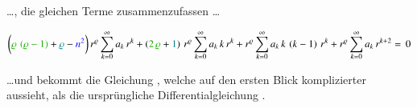 \begin{normalsize}
	\dots , die gleichen Terme zusammenzufassen \dots
\end{normalsize}
\begin{align}
	\biggl(
	\textcolor{mygreen}{\varrho \, \left( \varrho - 1 \right)}
	+ 
	\textcolor{teal}{\varrho}
	-
	\textcolor{blue}{n^2}
	\biggr)
	\, r^{\varrho}
	\sum_{k=0}^{\infty} a_k \, r^k
	+ 
	\left(	
	\textcolor{mygreen}{2 \, \varrho}
	+
	\textcolor{teal}{1}
	\right)
	\, r^{\varrho}
	\sum_{k=0}^{\infty} a_k \, k \, r^k
	+
	r^{\varrho}
	\sum_{k=0}^{\infty} a_k \, k \, \left( k - 1 \right) \, r^k
	+ 
	r^{\varrho}
	\sum_{k=0}^{\infty} a_k \, r^{k + 2}
	= \, 0
	\label{eq:bessel:potenzreihe:dgl:vereinfacht}
\end{align}
\begin{normalsize}
	\dots und bekommt die Gleichung ,
	welche auf den ersten Blick komplizierter aussieht,
	als die urspr\"ungliche Differentialgleichung .
\end{normalsize}
